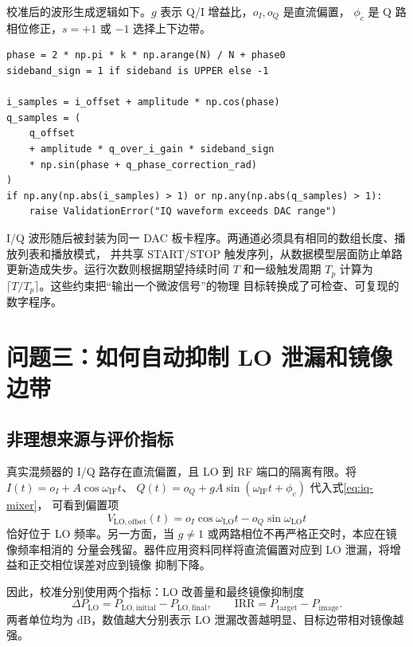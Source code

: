\documentclass[UTF8,zihao=-4,a4paper]{ctexart}
\begin{document}
校准后的波形生成逻辑如下。$g$ 表示 Q/I 增益比，$o_I,o_Q$ 是直流偏置，
$\phi_c$ 是 Q 路相位修正，$s=+1$ 或 $-1$ 选择上下边带。

\begin{lstlisting}[caption={校准后的同步 IQ 波形生成},label={lst:iq-waveform}]
phase = 2 * np.pi * k * np.arange(N) / N + phase0
sideband_sign = 1 if sideband is UPPER else -1

i_samples = i_offset + amplitude * np.cos(phase)
q_samples = (
    q_offset
    + amplitude * q_over_i_gain * sideband_sign
    * np.sin(phase + q_phase_correction_rad)
)
if np.any(np.abs(i_samples) > 1) or np.any(np.abs(q_samples) > 1):
    raise ValidationError("IQ waveform exceeds DAC range")
\end{lstlisting}

I/Q 波形随后被封装为同一 DAC 板卡程序。两通道必须具有相同的数组长度、播放列表和播放模式，
并共享 START/STOP 触发序列，从数据模型层面防止单路更新造成失步。运行次数则根据期望持续时间
$T$ 和一级触发周期 $T_p$ 计算为 $\lceil T/T_p\rceil$。这些约束把“输出一个微波信号”的物理
目标转换成了可检查、可复现的数字程序。

\section{问题三：如何自动抑制 LO 泄漏和镜像边带}

\subsection{非理想来源与评价指标}

真实混频器的 I/Q 路存在直流偏置，且 LO 到 RF 端口的隔离有限。将
$I(t)=o_I+A\cos\omega_{\mathrm{IF}}t$、
$Q(t)=o_Q+gA\sin(\omega_{\mathrm{IF}}t+\phi_c)$ 代入式\eqref{eq:iq-mixer}，
可看到偏置项
\begin{equation}
  V_{\mathrm{LO,offset}}(t)=o_I\cos\omega_{\mathrm{LO}}t
  -o_Q\sin\omega_{\mathrm{LO}}t
  \label{eq:lo-leakage}
\end{equation}
恰好位于 LO 频率。另一方面，当 $g\neq1$ 或两路相位不再严格正交时，本应在镜像频率相消的
分量会残留。器件应用资料同样将直流偏置对应到 LO 泄漏，将增益和正交相位误差对应到镜像
抑制下降\cite{analogdevices_iq}。

因此，校准分别使用两个指标：LO 改善量和最终镜像抑制度
\begin{equation}
  \Delta P_{\mathrm{LO}}
  =P_{\mathrm{LO,initial}}-P_{\mathrm{LO,final}},\qquad
  \mathrm{IRR}=P_{\mathrm{target}}-P_{\mathrm{image}}.
  \label{eq:metrics}
\end{equation}
两者单位均为 dB，数值越大分别表示 LO 泄漏改善越明显、目标边带相对镜像越强。
\end{document}
